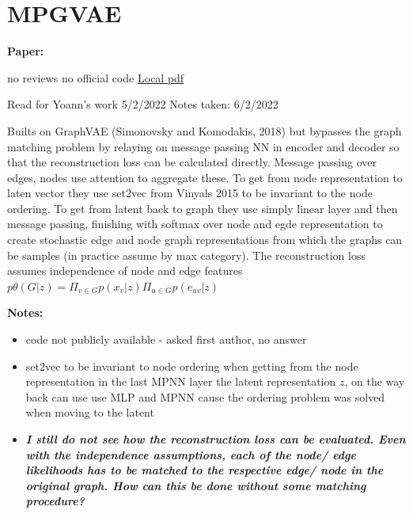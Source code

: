 \clearpage

\section{MPGVAE}\label{sec:MPGVAE}

\begin{notebox}
\textbf{Paper: } 
\vspace{5pt}

no reviews
\hspace{1cm}
no official code
\hspace{1cm}
\href{Flam-Shepherd et al_2021_MPGVAE.pdf}{Local pdf}
\vspace{3pt}

Read for Yoann's work 5/2/2022
\hfill Notes taken: 6/2/2022 
\end{notebox}

\begin{notebox}[colback=red!5]
\tldr Builts on GraphVAE (Simonovsky and Komodakis, 2018) but bypasses the graph matching problem by relaying on message passing NN in encoder and decoder so that the reconstruction loss can be calculated directly. Message passing over edges, nodes use attention to aggregate these.
To get from node representation to laten vector they use set2vec from Vinyals 2015 to be invariant to the node ordering.
To get from latent back to graph they use simply linear layer and then message passing, finishing with softmax over node and egde representation to create stochastic edge and node graph representations from which the graphs can be samples (in practice assume by max category).
The reconstruction loss assumes independence of node and edge features $p\theta(G|z) = \Pi_{v \in G} p(x_v | z) \Pi_{u \in G} p(e_{uv} | z)$
\end{notebox}

\begin{notebox}[colback=yellow!5]
\textbf{Notes:} 
\begin{itemize}[nosep]
\item code not publicly available - asked first author, no answer
\item set2vec to be invariant to node ordering when getting from the node representation in the last MPNN layer the latent representation $z$, on the way back can use use MLP and MPNN cause the ordering problem was solved when moving to the latent
\item \emph{\textbf{I still do not see how the reconstruction loss can be evaluated. Even with the independence assumptions, each of the node/ edge likelihoods has to be matched to the respective edge/ node in the original graph. How can this be done without some matching procedure?}}
\end{itemize}
\end{notebox}


